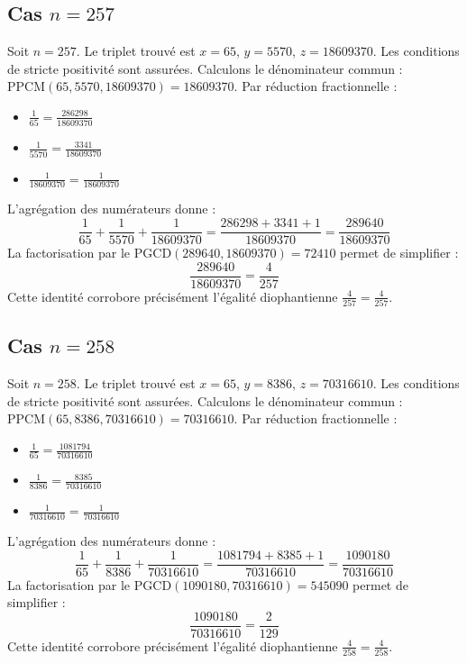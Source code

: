 \documentclass[11pt,a4paper]{article}
\begin{document}
\subsection{Cas $n = 257$}
Soit $n = 257$. Le triplet trouvé est $x = 65$, $y = 5570$, $z = 18609370$.
Les conditions de stricte positivité sont assurées.
Calculons le dénominateur commun : $\text{PPCM}(65, 5570, 18609370) = 18609370$.
Par réduction fractionnelle :
\begin{itemize}
    \item $\frac{1}{65} = \frac{286298}{18609370}$
    \item $\frac{1}{5570} = \frac{3341}{18609370}$
    \item $\frac{1}{18609370} = \frac{1}{18609370}$
\end{itemize}
L'agrégation des numérateurs donne :
$$ \frac{1}{65} + \frac{1}{5570} + \frac{1}{18609370} = \frac{286298 + 3341 + 1}{18609370} = \frac{289640}{18609370} $$
La factorisation par le $\text{PGCD}(289640, 18609370) = 72410$ permet de simplifier :
$$ \frac{289640}{18609370} = \frac{4}{257} $$
Cette identité corrobore précisément l'égalité diophantienne $\frac{4}{257} = \frac{4}{257}$.

\subsection{Cas $n = 258$}
Soit $n = 258$. Le triplet trouvé est $x = 65$, $y = 8386$, $z = 70316610$.
Les conditions de stricte positivité sont assurées.
Calculons le dénominateur commun : $\text{PPCM}(65, 8386, 70316610) = 70316610$.
Par réduction fractionnelle :
\begin{itemize}
    \item $\frac{1}{65} = \frac{1081794}{70316610}$
    \item $\frac{1}{8386} = \frac{8385}{70316610}$
    \item $\frac{1}{70316610} = \frac{1}{70316610}$
\end{itemize}
L'agrégation des numérateurs donne :
$$ \frac{1}{65} + \frac{1}{8386} + \frac{1}{70316610} = \frac{1081794 + 8385 + 1}{70316610} = \frac{1090180}{70316610} $$
La factorisation par le $\text{PGCD}(1090180, 70316610) = 545090$ permet de simplifier :
$$ \frac{1090180}{70316610} = \frac{2}{129} $$
Cette identité corrobore précisément l'égalité diophantienne $\frac{4}{258} = \frac{4}{258}$.
\end{document}
